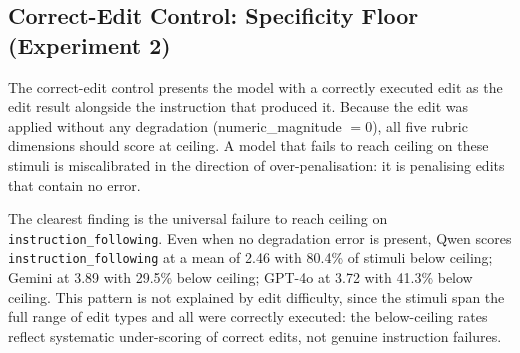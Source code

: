\subsection{Correct-Edit Control: Specificity Floor (Experiment 2)} \label{sec:correct-edit-control}

The correct-edit control presents the model with a correctly executed edit as the edit result alongside the instruction that produced it. Because the edit was applied without any degradation (numeric\_magnitude $= 0$), all five rubric dimensions should score at ceiling. A model that fails to reach ceiling on these stimuli is miscalibrated in the direction of over-penalisation: it is penalising edits that contain no error.

\begin{table}[htbp]
\centering
\caption{Correct-edit control: mean Experiment 2 scores and below-ceiling rates ($n = 46$ per model). ``Below-ceiling rate'' is the proportion of stimuli that received a score strictly below 5.}
\label{tab:correct-edit-control}
\end{table}

The clearest finding is the universal failure to reach ceiling on \texttt{instruction\_following}. Even when no degradation error is present, Qwen scores \texttt{instruction\_following} at a mean of 2.46 with 80.4\% of stimuli below ceiling; Gemini at 3.89 with 29.5\% below ceiling; GPT-4o at 3.72 with 41.3\% below ceiling. This pattern is not explained by edit difficulty, since the stimuli span the full range of edit types and all were correctly executed: the below-ceiling rates reflect systematic under-scoring of correct edits, not genuine instruction failures.


